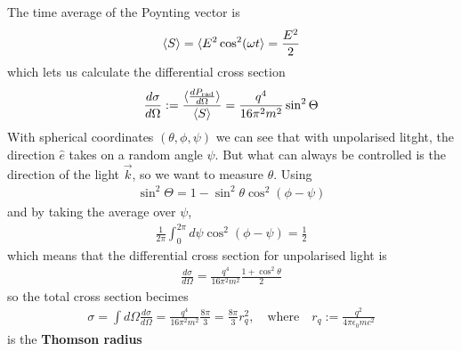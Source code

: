 The time average of the Poynting vector is
\begin{align*}
  \langle S\rangle = \langle E^{2} \cos^{2}(\omega t\rangle = \frac{E^{2}}{2}
\end{align*}
which lets us calculate the differential cross section
\begin{align*}
  \frac{d \sigma}{d \Omega} := \frac{\langle\frac{d P_{\text{rad}}}{d \Omega}\rangle}{\langle S\rangle} = \frac{q^{4}}{16 \pi^{2} m^{2}} \sin^{2} \Theta
\end{align*}
With spherical coordinates $(\theta,\phi,\psi)$ we can see that with unpolarised litght, the direction $\hat{e}$ takes on a random angle $\psi$.
But what can always be controlled is the direction of the light $\vec{k}$, so we want to measure $\theta$.
Using
\begin{align*}
  \sin^{2} \Theta = 1 - \sin^{2} \theta \cos^{2}(\phi - \psi)
\end{align*}
and by taking the average over $\psi$,
\begin{align*}
  \frac{1}{2 \pi}\int_0^{2 \pi} d \psi \cos^{2}(\phi - \psi) = \frac{1}{2} 
\end{align*}
which means that the differential cross section for unpolarised light is
\begin{align*}
  \frac{d \sigma}{d \Omega} = \frac{q^{4}}{16 \pi^{2} m^{2}} \frac{1 + \cos^{2} \theta}{2}
\end{align*}
so the total cross section becimes
\begin{align*}
  \sigma = \int d \Omega \frac{d \sigma}{d \Omega} = \frac{q^{4}}{16 \pi^{2}m^{2}} \frac{8 \pi}{3} = \frac{8 \pi}{3} r_q^{2}, \quad \text{where} \quad r_q := \frac{q^{2}}{4 \pi \epsilon_0 m c^{2}}
\end{align*}
is the \textbf{Thomson radius}




